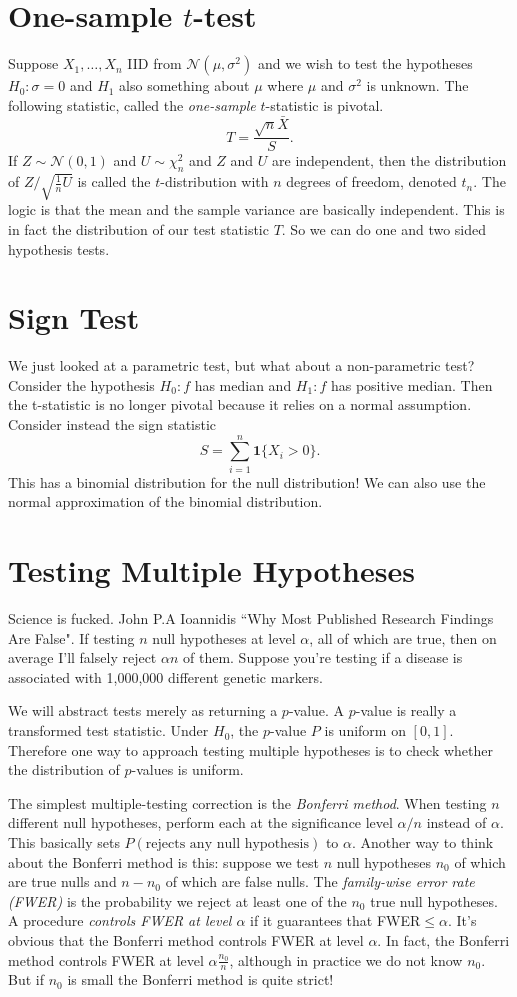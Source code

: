 \section{One-sample $t$-test}
Suppose $X_1, \dots, X_n$ IID from $ \mathcal{N}(\mu, \sigma^2)$ and we wish to test the hypotheses $H_0: \sigma=0$ and $H_1$ also something about $\mu$ where $\mu$ and $\sigma^2$ is unknown. The following statistic, called the {\it one-sample} $t$-statistic is pivotal. 
\[T = \frac{\sqrt{n}\bar{X}}{S}. \]
If $Z\sim \mathcal{N}(0, 1)$ and $U\sim \chi_n^2$ and $Z$ and $U$ are independent, then the distribution of $Z/\sqrt{\frac{1}{n}U}$ is called the $t$-distribution with $n$ degrees of freedom, denoted $t_n$. The logic is that the mean and the sample variance are basically independent. This is in fact the distribution of our test statistic $T$. So we can do one and two sided hypothesis tests. 

\section{Sign Test}
We just looked at a parametric test, but what about a non-parametric test? Consider the hypothesis $H_0: f$ has median and $H_1: f$ has positive median. Then the t-statistic is no longer pivotal because it relies on a normal assumption. Consider instead the sign statistic 
\[S = \sum_{i=1}^n\mathbf{1}\{X_i>0\}. \]
This has a binomial distribution for the null distribution! We can also use the normal approximation of the binomial distribution. 

\section{Testing Multiple Hypotheses}
Science is fucked. John P.A Ioannidis ``Why Most Published Research Findings Are False". If testing $n$ null hypotheses at level $\alpha$, all of which are true, then on average I'll falsely reject $\alpha n$ of them. Suppose you're testing if a disease is associated with 1,000,000 different genetic markers. 

We will abstract tests merely as returning a $p$-value. A $p$-value is really a transformed test statistic. Under $H_0$, the $p$-value $P$ is uniform on $[0, 1]$. Therefore one way to approach testing multiple hypotheses is to check whether the distribution of $p$-values is uniform. 

The simplest multiple-testing correction is the {\it Bonferri method}. When testing $n$ different null hypotheses, perform each at the significance level $\alpha/n$ instead of $\alpha$. This basically sets $P(\text{rejects any null hypothesis})$ to $\alpha$. 
Another way to think about the Bonferri method is this: suppose we test $n$ null hypotheses $n_0$ of which are true nulls and $n-n_0$ of which are false nulls. The {\it family-wise error rate (FWER)} is the probability we reject at least one of the $n_0$ true null hypotheses. A procedure {\it controls FWER at level $\alpha$} if it guarantees that FWER$\leq\alpha$. It's obvious that the Bonferri method controls FWER at level $\alpha$. In fact, the Bonferri method controls FWER at level $\alpha\frac{n_0}{n}$, although in practice we do not know $n_0$. But if $n_0$ is small the Bonferri method is quite strict! 


